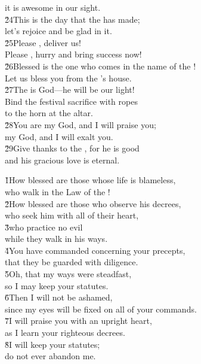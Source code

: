 \begin{poetry}
\poemll    it is awesome in our sight. \\
\poeml \v{24}This is the day that the  has made; \\
\poemll    let's rejoice and be glad in it. \\
\poeml \v{25}Please , deliver us! \\
\poemll    Please , hurry and bring success now! \\
\poeml \v{26}Blessed is the one who comes in the name of the ! \\
\poemll    Let us bless you from the 's house. \\
\poeml \v{27}The  is God---he will be our light! \\
\poemll    Bind the festival sacrifice with ropes \\
\poemlll       to the horn at the altar. \\
\poeml \v{28}You are my God, and I will praise you; \\
\poemll    my God, and I will exalt you. \\
\poeml \v{29}Give thanks to the , for he is good \\
\poemll    and his gracious love is eternal.
\end{poetry}

\begin{poetry}
\poeml \v{1}How blessed are those whose life is blameless, \\
\poemll    who walk in the Law of the ! \\
\poeml \v{2}How blessed are those who observe his decrees, \\
\poemll    who seek him with all of their heart, \\
\poeml \v{3}who practice no evil \\
\poemll    while they walk in his ways. \\
\poeml \v{4}You have commanded concerning your precepts, \\
\poemll    that they be guarded with diligence. \\
\poeml \v{5}Oh, that my ways were steadfast, \\
\poemll    so I may keep your statutes. \\
\poeml \v{6}Then I will not be ashamed, \\
\poemll    since my eyes will be fixed on all of your commands. \\
\poeml \v{7}I will praise you with an upright heart, \\
\poemll    as I learn your righteous decrees. \\
\poeml \v{8}I will keep your statutes; \\
\poemll    do not ever abandon me.
\end{poetry}

